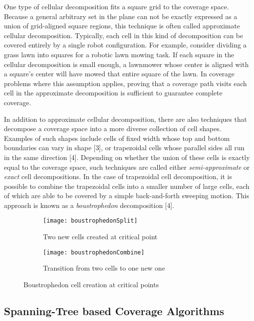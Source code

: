 One type of cellular decomposition fits a square grid to the coverage space. Because a general arbitrary set in the plane can not be exactly expressed as a union of grid-aligned square regions, this technique is often called approximate cellular decomposition. Typically, each cell in this kind of decomposition can be covered entirely by a single robot configuration. For example, consider dividing a grass lawn into squares for a robotic lawn mowing task. If each square in the cellular decomposition is small enough, a lawnmower whose center is aligned with a square's center will have mowed that entire square of the lawn. In coverage problems where this assumption applies, proving that a coverage path visits each cell in the approximate decomposition is sufficient to guarantee complete coverage.

In addition to approximate cellular decomposition, there are also techniques that decompose a coverage space into a more diverse collection of cell shapes. Examples of such shapes include cells of fixed width whose top and bottom boundaries can vary in shape [3], or trapezoidal cells whose parallel sides all run in the same direction [4]. Depending on whether the union of these cells is exactly equal to the coverage space, such techniques are called either \textit{semi-approximate} or \textit{exact} cell decompositions. In the case of trapezoidal cell decomposition, it is possible to combine the trapezoidal cells into a smaller number of large cells, each of which are able to be covered by a simple back-and-forth sweeping motion. This approach is known as a \textit{boustrophedon} decomposition [4].

\begin{figure}[H]
\begin{subfigure}{.5\textwidth}
  \centering
  \texttt{[image: boustrophedonSplit]}
  \caption{Two new cells created at critical point}
\end{subfigure}
\begin{subfigure}{.5\textwidth}
  \centering
  \texttt{[image: boustrophedonCombine]}
  \caption{Transition from two cells to one new one}
\end{subfigure}
\caption[Boustrophedon Decomposition]{Boustrophedon cell creation at critical points}
\end{figure}

\subsection{Spanning-Tree based Coverage Algorithms}


